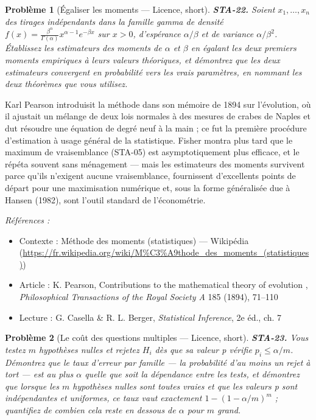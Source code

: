 \documentclass[11pt]{article}
\newtheorem{problem}{Problème}
\newenvironment{refs}{\par\small\noindent\emph{Références :}\begin{itemize}\setlength\itemsep{0pt}}{\end{itemize}\normalsize}
\begin{document}
\bigskip

\begin{problem}[{Égaliser les moments --- Licence, short}]
\textbf{STA-22.} Soient $ x_1, \dots, x_n $ des tirages indépendants dans la
famille gamma de densité
$ f(x) = \frac{\beta^{\alpha}}{\Gamma(\alpha)} x^{\alpha-1} e^{-\beta x} $ sur $ x >0 $,
d'espérance $ \alpha/\beta $ et de variance $ \alpha/\beta^2 $. Établissez les estimateurs des
moments de $ \alpha $ et $ \beta $ en égalant les deux premiers moments empiriques à leurs
valeurs théoriques, et démontrez que les deux estimateurs convergent en probabilité vers les vrais
paramètres, en nommant les deux théorèmes que vous utilisez.
\end{problem}

\noindent Karl Pearson introduisit la méthode dans son mémoire de 1894 sur l'évolution, où
il ajustait un mélange de deux lois normales à des mesures de crabes de Naples et dut résoudre une
équation de degré neuf à la main ; ce fut la première procédure d'estimation à usage général de la
statistique. Fisher montra plus tard que le maximum de vraisemblance (STA-05) est asymptotiquement
plus efficace, et le répéta souvent sans ménagement --- mais les estimateurs des moments survivent
parce qu'ils n'exigent aucune vraisemblance, fournissent d'excellents points de départ pour une
maximisation numérique et, sous la forme généralisée due à Hansen (1982), sont l'outil standard de
l'économétrie.

\begin{refs}
\item Contexte : Méthode des moments (statistiques) --- Wikipédia (\url{https://fr.wikipedia.org/wiki/M%C3%A9thode_des_moments_(statistiques)})
\item Article : K. Pearson, \og{} Contributions to the mathematical theory of evolution \fg{}, \textit{Philosophical Transactions of the Royal Society A} 185 (1894), 71--110
\item Lecture : G. Casella \& R. L. Berger, \textit{Statistical Inference}, 2e éd., ch. 7
\end{refs}

\bigskip

\begin{problem}[{Le coût des questions multiples --- Licence, short}]
\textbf{STA-23.} Vous testez $ m $ hypothèses nulles et rejetez $ H_i $
dès que sa valeur p vérifie $ p_i \le \alpha/m $. Démontrez que le taux d'erreur par famille --- la
probabilité d'au moins un rejet à tort --- est au plus $ \alpha $ quelle que soit la dépendance
entre les tests, et démontrez que lorsque les $ m $ hypothèses nulles sont toutes vraies et que
les valeurs p sont indépendantes et uniformes, ce taux vaut exactement
$ 1 - (1 - \alpha/m)^m $ ; quantifiez de combien cela reste en dessous de $ \alpha $ pour
$ m $ grand.
\end{problem}
\end{document}
